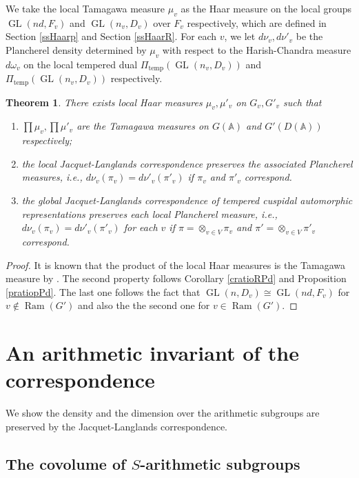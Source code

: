 \documentclass[11pt]{article}
\theoremstyle{plain}
\newtheorem{theorem}{Theorem}[section]
\theoremstyle{remark}
\theoremstyle{definition}
\DeclareMathOperator{\GL}{GL}
\DeclareMathOperator{\tp}{temp}
\DeclareMathOperator{\ram}{Ram}
\begin{document}
We take the local Tamagawa measure $\mu_v$ as the Haar measure on the local groups $\GL(nd,F_v)$ and $\GL(n_v,D_v)$ over $F_v$ respectively, which are defined in Section \ref{ssHaarp} and Section \ref{ssHaarR}. 
For each $v$, we let $d \nu_v, d \nu'_v$ be the Plancherel density determined by $\mu_v$ with respect to the Harish-Chandra measure $d \omega_v$ on the local tempered dual $\Pi_{\tp}(\GL(n_v,D_v))$ and $\Pi_{\tp}(\GL(n_v,D_v))$ respectively. 
\begin{theorem}\label{tpreallPm}
There exists local Haar measures $\mu_v,\mu'_v$ on $G_v,G'_v$ such that 
\begin{enumerate}
    \item $\prod \mu_v,\prod \mu'_v$ are the Tamagawa measures on $G(\mathbb{A})$ and $G'(D(\mathbb{A}))$ respectively;
    \item the local Jacquet-Langlands correspondence preserves the associated Plancherel measures, i.e., $d \nu_{v}(\pi_v)=d \nu'_{v}(\pi'_v)$ if $\pi_v$ and $\pi'_v$ correspond. 
    \item the global Jacquet-Langlands correspondence of tempered cuspidal automorphic representations preserves each local Plancherel measure, i.e., $d \nu_v(\pi_v)=d \nu'_v(\pi'_v)$ for each $v$ if $\pi=\otimes_{v\in V}\pi_v$ and $\pi'=\otimes_{v\in V}\pi'_v$ correspond. 
\end{enumerate}
\end{theorem}
\begin{proof}
It is known that the product of the local Haar measures is the Tamagawa measure by \cite[\S 29.8]{Voight21}. 
The second property follows Corollary \ref{cratioRPd} and Proposition \ref{pratiopPd}. 
The last one follows the fact that $\GL(n,D_v)\cong \GL(nd,F_v)$ for $v\notin \ram(G')$ and also the the second one for $v\in \ram(G')$. 
\end{proof}

\section{An arithmetic invariant of the correspondence}\label{sJLinv}

We show the density and the dimension over the arithmetic subgroups are preserved by the Jacquet-Langlands correspondence. 


\subsection{The covolume of $S$-arithmetic subgroups}
\end{document}
